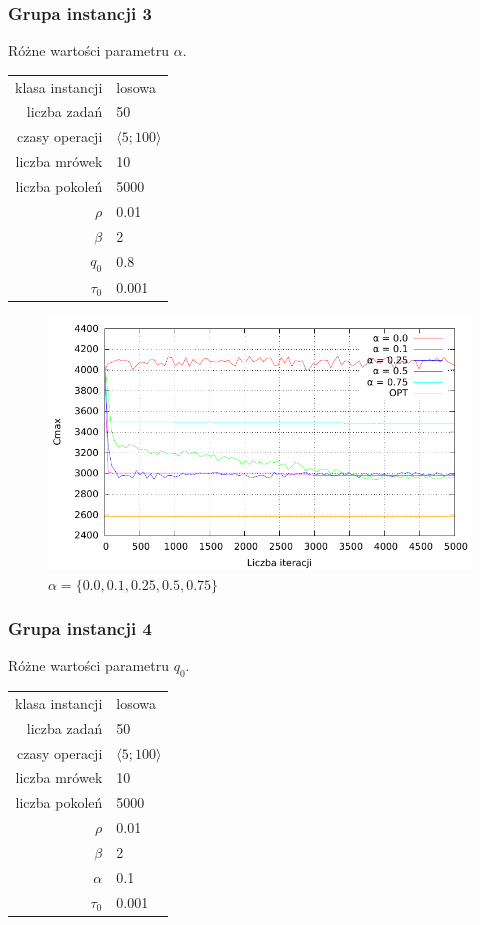 \documentclass[10pt,a4paper]{article}
\begin{document}
\newpage
\subsubsection{Grupa instancji 3}
Różne wartości parametru $\alpha$.

\begin{center}
\begin{tabular}{|r|l|}
  \hline
  klasa instancji & losowa \\
  liczba zadań & 50 \\
  czasy operacji & $ \langle 5;100 \rangle $  \\
  liczba mrówek & 10 \\
  liczba pokoleń & 5000 \\
  $ \rho $ & 0.01 \\
  $ \beta $ & 2 \\
  $ q_0 $ & 0.8 \\
  $ \tau_0 $ & 0.001 \\
  \hline
\end{tabular}
\end{center}

\begin{figure}[h]
    \centering
    \includegraphics{./figures/inst01_rnd_alpha_smooth.pdf}
    \caption{$ \alpha = \{ 0.0, 0.1, 0.25, 0.5, 0.75 \} $}
\end{figure}

\newpage
\subsubsection{Grupa instancji 4}
Różne wartości parametru $q_0$.

\begin{center}
\begin{tabular}{|r|l|}
  \hline
  klasa instancji & losowa \\
  liczba zadań & 50 \\
  czasy operacji & $ \langle 5;100 \rangle $  \\
  liczba mrówek & 10 \\
  liczba pokoleń & 5000 \\
  $ \rho $ & 0.01 \\
  $ \beta $ & 2 \\
  $ \alpha $ & 0.1 \\
  $ \tau_0 $ & 0.001 \\
  \hline
\end{tabular}
\end{center}
\end{document}
